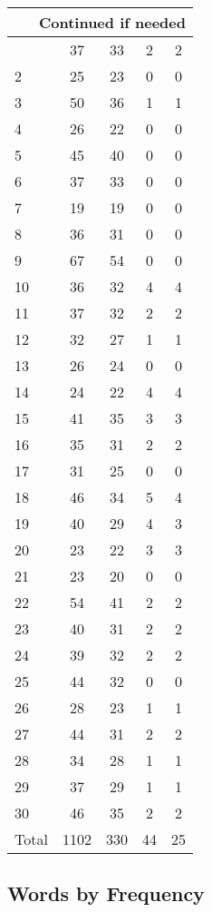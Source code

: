 \begin{center}
\begin{longtable}{l|c|c|c|c}
\hline \multicolumn{5}{|r|}{{Continued if needed}} \\ \hline
\endfoot 
1 & 37 & 33 & 2 & 2\\ \hline
2 & 25 & 23 & 0 & 0\\ \hline
3 & 50 & 36 & 1 & 1\\ \hline
4 & 26 & 22 & 0 & 0\\ \hline
5 & 45 & 40 & 0 & 0\\ \hline
6 & 37 & 33 & 0 & 0\\ \hline
7 & 19 & 19 & 0 & 0\\ \hline
8 & 36 & 31 & 0 & 0\\ \hline
9 & 67 & 54 & 0 & 0\\ \hline
10 & 36 & 32 & 4 & 4\\ \hline
11 & 37 & 32 & 2 & 2\\ \hline
12 & 32 & 27 & 1 & 1\\ \hline
13 & 26 & 24 & 0 & 0\\ \hline
14 & 24 & 22 & 4 & 4\\ \hline
15 & 41 & 35 & 3 & 3\\ \hline
16 & 35 & 31 & 2 & 2\\ \hline
17 & 31 & 25 & 0 & 0\\ \hline
18 & 46 & 34 & 5 & 4\\ \hline
19 & 40 & 29 & 4 & 3\\ \hline
20 & 23 & 22 & 3 & 3\\ \hline
21 & 23 & 20 & 0 & 0\\ \hline
22 & 54 & 41 & 2 & 2\\ \hline
23 & 40 & 31 & 2 & 2\\ \hline
24 & 39 & 32 & 2 & 2\\ \hline
25 & 44 & 32 & 0 & 0\\ \hline
26 & 28 & 23 & 1 & 1\\ \hline
27 & 44 & 31 & 2 & 2\\ \hline
28 & 34 & 28 & 1 & 1\\ \hline
29 & 37 & 29 & 1 & 1\\ \hline
30 & 46 & 35 & 2 & 2\\ \hline
\hline \hline
Total & 1102 & 330 & 44 & 25



\end{longtable}
\end{center}

 
\subsection{Words by Frequency}

